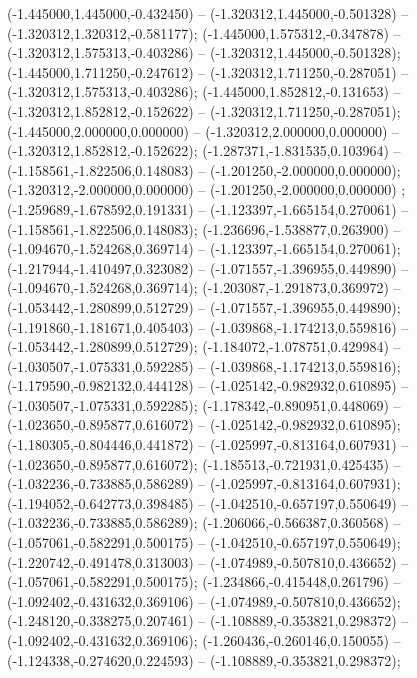  (-1.445000,1.445000,-0.432450) -- (-1.320312,1.445000,-0.501328) -- (-1.320312,1.320312,-0.581177);
 (-1.445000,1.575312,-0.347878) -- (-1.320312,1.575313,-0.403286) -- (-1.320312,1.445000,-0.501328);
 (-1.445000,1.711250,-0.247612) -- (-1.320312,1.711250,-0.287051) -- (-1.320312,1.575313,-0.403286);
 (-1.445000,1.852812,-0.131653) -- (-1.320312,1.852812,-0.152622) -- (-1.320312,1.711250,-0.287051);
 (-1.445000,2.000000,0.000000) -- (-1.320312,2.000000,0.000000) -- (-1.320312,1.852812,-0.152622);
 (-1.287371,-1.831535,0.103964) -- (-1.158561,-1.822506,0.148083) -- (-1.201250,-2.000000,0.000000);
 (-1.320312,-2.000000,0.000000) -- (-1.201250,-2.000000,0.000000) ;
 (-1.259689,-1.678592,0.191331) -- (-1.123397,-1.665154,0.270061) -- (-1.158561,-1.822506,0.148083);
 (-1.236696,-1.538877,0.263900) -- (-1.094670,-1.524268,0.369714) -- (-1.123397,-1.665154,0.270061);
 (-1.217944,-1.410497,0.323082) -- (-1.071557,-1.396955,0.449890) -- (-1.094670,-1.524268,0.369714);
 (-1.203087,-1.291873,0.369972) -- (-1.053442,-1.280899,0.512729) -- (-1.071557,-1.396955,0.449890);
 (-1.191860,-1.181671,0.405403) -- (-1.039868,-1.174213,0.559816) -- (-1.053442,-1.280899,0.512729);
 (-1.184072,-1.078751,0.429984) -- (-1.030507,-1.075331,0.592285) -- (-1.039868,-1.174213,0.559816);
 (-1.179590,-0.982132,0.444128) -- (-1.025142,-0.982932,0.610895) -- (-1.030507,-1.075331,0.592285);
 (-1.178342,-0.890951,0.448069) -- (-1.023650,-0.895877,0.616072) -- (-1.025142,-0.982932,0.610895);
 (-1.180305,-0.804446,0.441872) -- (-1.025997,-0.813164,0.607931) -- (-1.023650,-0.895877,0.616072);
 (-1.185513,-0.721931,0.425435) -- (-1.032236,-0.733885,0.586289) -- (-1.025997,-0.813164,0.607931);
 (-1.194052,-0.642773,0.398485) -- (-1.042510,-0.657197,0.550649) -- (-1.032236,-0.733885,0.586289);
 (-1.206066,-0.566387,0.360568) -- (-1.057061,-0.582291,0.500175) -- (-1.042510,-0.657197,0.550649);
 (-1.220742,-0.491478,0.313003) -- (-1.074989,-0.507810,0.436652) -- (-1.057061,-0.582291,0.500175);
 (-1.234866,-0.415448,0.261796) -- (-1.092402,-0.431632,0.369106) -- (-1.074989,-0.507810,0.436652);
 (-1.248120,-0.338275,0.207461) -- (-1.108889,-0.353821,0.298372) -- (-1.092402,-0.431632,0.369106);
 (-1.260436,-0.260146,0.150055) -- (-1.124338,-0.274620,0.224593) -- (-1.108889,-0.353821,0.298372);
